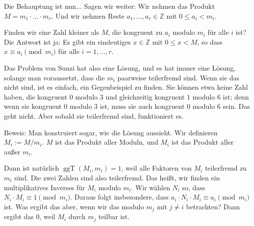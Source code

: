 \begin{spoken-clean}[01:05:09 - 01:07:24]
Die Behauptung ist nun... Sagen wir weiter: Wir nehmen das Produkt $M = m_1 \cdot \dots \cdot m_r$. Und wir nehmen Reste $a_1, \dots, a_r \in \mathbb{Z}$ mit $0 \le a_i < m_i$.

Finden wir eine Zahl kleiner als $M$, die kongruent zu $a_i$ modulo $m_i$ für alle $i$ ist? Die Antwort ist ja: Es gibt ein eindeutiges $x \in \mathbb{Z}$ mit $0 \le x < M$, so dass $x \equiv a_i \pmod{m_i}$ für alle $i = 1, \dots, r$.

Das Problem von Sunzi hat also eine Lösung, und es hat immer eine Lösung, solange man voraussetzt, dass die $m_i$ paarweise teilerfremd sind. Wenn sie das nicht sind, ist es einfach, ein Gegenbeispiel zu finden. Sie können etwa keine Zahl haben, die kongruent $0$ modulo $3$ und gleichzeitig kongruent $1$ modulo $6$ ist; denn wenn sie kongruent $0$ modulo $3$ ist, muss sie auch kongruent $0$ modulo $6$ sein. Das geht nicht. Aber sobald sie teilerfremd sind, funktioniert es.
\end{spoken-clean}

\begin{math-stroke}
\end{math-stroke}

\begin{spoken-clean}[01:07:24 - 01:09:54]
Beweis: Man konstruiert sogar, wie die Lösung aussieht. Wir definieren $M_i := M / m_i$.  $M$ ist das Produkt aller Moduln, und $M_i$ ist das Produkt aller außer $m_i$.

Dann ist natürlich $\operatorname{ggT}(M_i, m_i) = 1$, weil alle Faktoren von $M_i$ teilerfremd zu $m_i$ sind. Die zwei Zahlen sind also teilerfremd. Das heißt, wir finden ein multiplikatives Inverses für $M_i$ modulo $m_i$. Wir wählen $N_i$ so, dass $N_i \cdot M_i \equiv 1 \pmod{m_i}$. Daraus folgt insbesondere, dass $a_i \cdot N_i \cdot M_i \equiv a_i \pmod{m_i}$ ist. Was ergibt das aber, wenn wir das modulo $m_j$ mit $j \neq i$ betrachten? Dann ergibt das $0$, weil $M_i$ durch $m_j$ teilbar ist.
\end{spoken-clean}

